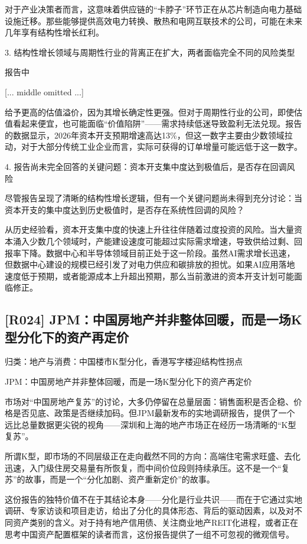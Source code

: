 \documentclass[11pt]{ctexart}
\begin{document}
对于产业决策者而言，这意味着供应链的“卡脖子”环节正在从芯片制造向电力基础设施迁移。那些能够提供高效电力转换、散热和电网互联技术的公司，可能在未来几年享有结构性增长红利。

3. 结构性增长领域与周期性行业的背离正在扩大，两者面临完全不同的风险类型

报告中

[... middle omitted ...]

给予更高的估值溢价，因为其增长确定性更强。但对于周期性行业的公司，即使估值看起来便宜，也可能面临“价值陷阱”——需求持续低迷导致盈利无法兑现。报告的数据显示，2026年资本开支预期增速高达13\%，但这一数字主要由少数领域拉动，对于大部分传统工业企业而言，实际可获得的订单增量可能远低于这一数字。

4. 报告尚未完全回答的关键问题：资本开支集中度达到极值后，是否存在回调风险

尽管报告呈现了清晰的结构性增长逻辑，但有一个关键问题尚未得到充分讨论：当资本开支的集中度达到历史极值时，是否存在系统性回调的风险？

从历史经验看，资本开支集中度的快速上升往往伴随着过度投资的风险。当大量资本涌入少数几个领域时，产能建设速度可能超过实际需求增速，导致供给过剩、回报率下降。数据中心和半导体领域目前正处于这一阶段。虽然AI需求增长迅速，但数据中心建设的规模已经引发了对电力供应和碳排放的担忧。如果AI应用落地速度低于预期，或者能源成本上升超出预期，那么当前激进的资本开支计划可能面临修正。

\subsection{[R024] JPM：中国房地产并非整体回暖，而是一场K型分化下的资产再定价}
{\small\color{refgray}归类：地产与消费：中国楼市K型分化，香港写字楼迎结构性拐点}

JPM：中国房地产并非整体回暖，而是一场K型分化下的资产再定价

市场对“中国房地产复苏”的讨论，大多仍停留在总量层面：销售面积是否企稳、价格是否见底、政策是否继续加码。但JPM最新发布的实地调研报告，提供了一个远比总量数据更尖锐的视角——深圳和上海的地产市场正在经历一场清晰的“K型复苏”。

所谓K型，即市场的不同层级正在走向截然不同的方向：高端住宅需求旺盛、去化迅速，入门级住房交易量有所恢复，而中间价位段则持续承压。这不是一个“复苏”的故事，而是一个“分化加剧、资产重新定价”的故事。

这份报告的独特价值不在于其结论本身——分化是行业共识——而在于它通过实地调研、专家访谈和项目走访，给出了分化的具体形态、背后的驱动因素，以及对不同资产类别的含义。对于持有地产信用债、关注商业地产REIT化进程，或者正在思考中国资产配置框架的读者而言，这份报告提供了一组不可忽视的微观信号。
\end{document}

